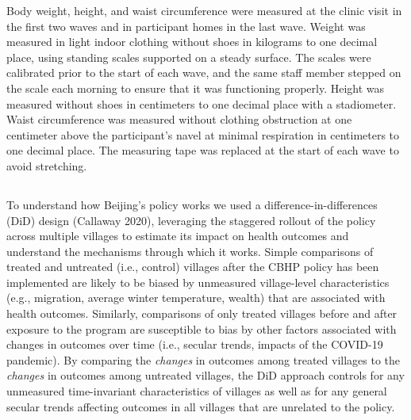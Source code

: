 \documentclass[
  letterpaper,
  DIV=11,
  numbers=noendperiod]{scrartcl}
\providecommand{\DIFaddtex}[1]{{\protect\color{blue}\uwave{#1}}} %
\providecommand{\DIFaddbegin}{} %
\providecommand{\DIFaddend}{} %
\providecommand{\DIFdelbegin}{} %
\providecommand{\DIFdelend}{} %
\providecommand{\DIFadd}[1]{\texorpdfstring{\DIFaddtex{#1}}{#1}} %
\newcommand{\DIFscaledelfig}{0.5}
\newlength{\DIFdelgraphicswidth} %
\newlength{\DIFdelgraphicsheight} %
\newcommand{\DIFaddincludegraphics}[2][]{{\color{blue}\fbox{\DIFOincludegraphics[#1]{#2}}}} %
\newcommand{\DIFdelincludegraphics}[2][]{%
\sbox{\DIFdelgraphicsbox}{\DIFOincludegraphics[#1]{#2}}%
\settoboxwidth{\DIFdelgraphicswidth}{\DIFdelgraphicsbox} %
\settoboxtotalheight{\DIFdelgraphicsheight}{\DIFdelgraphicsbox} %
\scalebox{\DIFscaledelfig}{%
\parbox[b]{\DIFdelgraphicswidth}{\usebox{\DIFdelgraphicsbox}\\[-\baselineskip] \rule{\DIFdelgraphicswidth}{0em}}\llap{\resizebox{\DIFdelgraphicswidth}{\DIFdelgraphicsheight}{%
\setlength{\unitlength}{\DIFdelgraphicswidth}%
\begin{picture}(1,1)%
\thicklines\linethickness{2pt} %
{\color[rgb]{1,0,0}\put(0,0){\framebox(1,1){}}}%
{\color[rgb]{1,0,0}\put(0,0){\line( 1,1){1}}}%
{\color[rgb]{1,0,0}\put(0,1){\line(1,-1){1}}}%
\end{picture}%
}\hspace*{3pt}}} %
} %
\DeclareRobustCommand{\DIFaddbegin}{\DIFOaddbegin \let\includegraphics\DIFaddincludegraphics} %
\DeclareRobustCommand{\DIFaddend}{\DIFOaddend \let\includegraphics\DIFOincludegraphics} %
\DeclareRobustCommand{\DIFdelbegin}{\DIFOdelbegin \let\includegraphics\DIFdelincludegraphics} %
\DeclareRobustCommand{\DIFdelend}{\DIFOaddend \let\includegraphics\DIFOincludegraphics} %
\begin{document}
Body weight, height, and waist circumference were measured at the clinic
visit in the first two waves and in participant homes in the last wave.
Weight was measured in light indoor clothing without shoes in kilograms
to one decimal place, using standing scales supported on a steady
surface. The scales were calibrated prior to the start of each wave, and
the same staff member stepped on the scale each morning to ensure that
it was functioning properly. Height was measured without shoes in
centimeters to one decimal place with a stadiometer. Waist circumference
was measured without clothing obstruction at one centimeter above the
participant's navel at minimal respiration in centimeters to one decimal
place. The measuring tape was replaced at the start of each wave to
avoid stretching.

\DIFdelbegin %
\DIFdelend \DIFaddbegin \subsection{\DIFadd{Measuring policy impacts}}\label{measuring-policy-impacts}
\DIFaddend 

To understand how Beijing's policy works we used a
difference-in-differences (DiD) design (Callaway 2020), leveraging the
staggered rollout of the policy across multiple villages to estimate its
impact on health outcomes and understand the mechanisms through which it
works. Simple comparisons of treated and untreated (i.e., control)
villages after the CBHP policy has been implemented are likely to be
biased by unmeasured village-level characteristics (e.g., migration,
average winter temperature, wealth) that are associated with health
outcomes. Similarly, comparisons of only treated villages before and
after exposure to the program are susceptible to bias by other factors
associated with changes in outcomes over time (i.e., secular trends,
impacts of the COVID-19 pandemic). By comparing the \emph{changes} in
outcomes among treated villages to the \emph{changes} in outcomes among
untreated villages, the DiD approach controls for any unmeasured
time-invariant characteristics of villages as well as for any general
secular trends affecting outcomes in all villages that are unrelated to
the policy.
\end{document}
